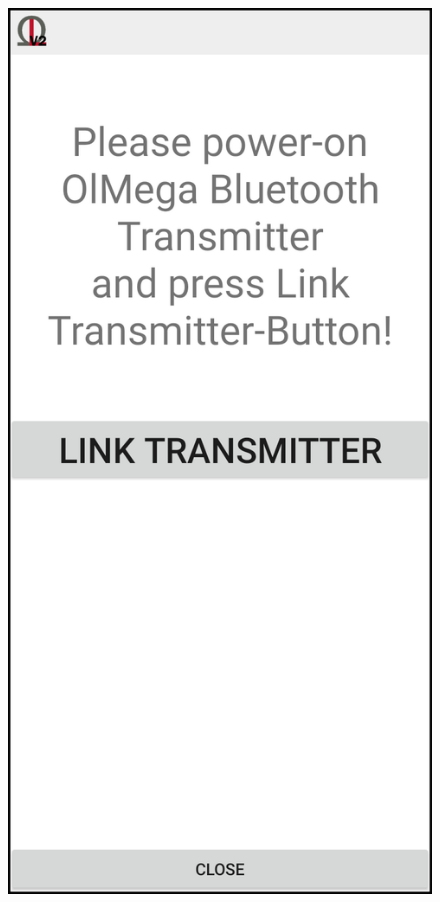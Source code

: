 \documentclass[11pt,a4paper,titlepage]{article}
\begin{document}
\begin{figure}
\begin{minipage}{0.30\textwidth}
			\includegraphics[width=1.00\textwidth]{images/linking.png}
			\label{fig:menu}
			\vspace{-2cm}
			\end{minipage}
	\end{figure}
\end{document}
